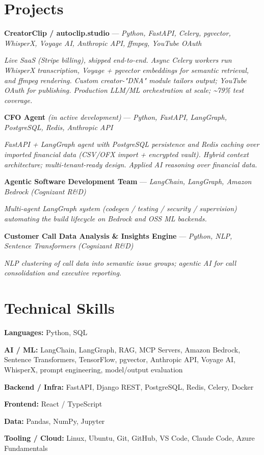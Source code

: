 \documentclass[10pt]{article}
\begin{document}
\section*{Projects}
\noindent \textbf{CreatorClip / autoclip.studio} — \textit{Python, FastAPI, Celery, pgvector, WhisperX, Voyage AI, Anthropic API, ffmpeg, YouTube OAuth}\par
\noindent\textit{Live SaaS (Stripe billing), shipped end-to-end. Async Celery workers run WhisperX transcription, Voyage + pgvector embeddings for semantic retrieval, and ffmpeg rendering. Custom creator-"DNA" module tailors output; YouTube OAuth for publishing. Production LLM/ML orchestration at scale; \textasciitilde{}79\% test coverage.}\par
\noindent \textbf{CFO Agent} \textit{(in active development)} — \textit{Python, FastAPI, LangGraph, PostgreSQL, Redis, Anthropic API}\par
\noindent\textit{FastAPI + LangGraph agent with PostgreSQL persistence and Redis caching over imported financial data (CSV/OFX import + encrypted vault). Hybrid context architecture; multi-tenant-ready design. Applied AI reasoning over financial data.}\par
\noindent \textbf{Agentic Software Development Team} — \textit{LangChain, LangGraph, Amazon Bedrock (Cognizant R\&D)}\par
\noindent\textit{Multi-agent LangGraph system (codegen / testing / security / supervision) automating the build lifecycle on Bedrock and OSS ML backends.}\par
\noindent \textbf{Customer Call Data Analysis \& Insights Engine} — \textit{Python, NLP, Sentence Transformers (Cognizant R\&D)}\par
\noindent\textit{NLP clustering of call data into semantic issue groups; agentic AI for call consolidation and executive reporting.}\par
\section*{Technical Skills}
\noindent \textbf{Languages:} Python, SQL\par
\noindent \textbf{AI / ML:} LangChain, LangGraph, RAG, MCP Servers, Amazon Bedrock, Sentence Transformers, TensorFlow, pgvector, Anthropic API, Voyage AI, WhisperX, prompt engineering, model/output evaluation\par
\noindent \textbf{Backend / Infra:} FastAPI, Django REST, PostgreSQL, Redis, Celery, Docker\par
\noindent \textbf{Frontend:} React / TypeScript\par
\noindent \textbf{Data:} Pandas, NumPy, Jupyter\par
\noindent \textbf{Tooling / Cloud:} Linux, Ubuntu, Git, GitHub, VS Code, Claude Code, Azure Fundamentals\par
\end{document}
